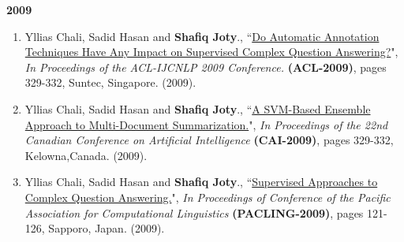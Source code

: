 \documentclass[paper=letter,fontsize=11pt]{scrartcl} %
\newcommand{\PaperEntry}[7]{
		\noindent #1, ``\href{#7}{#2}", \textit{#3} \textbf{#4}, #5 (#6).}
\begin{document}
\Large \textbf{2009} \normalsize
\begin{enumerate}

\item \PaperEntry{Yllias Chali, Sadid Hasan and \textbf{Shafiq Joty}.}{Do Automatic Annotation Techniques Have Any Impact on Supervised Complex Question Answering?}{In Proceedings of the ACL-IJCNLP 2009 Conference.} {(ACL-2009)}{pages 329-332, Suntec, Singapore.}{2009}
{http://www.aclweb.org/anthology/P09-2083}

\item \PaperEntry{Yllias Chali, Sadid Hasan and \textbf{Shafiq Joty}.}{A SVM-Based Ensemble Approach to Multi-Document Summarization.}{In Proceedings of the 22nd Canadian Conference on Artificial Intelligence } {(CAI-2009)}{pages 329-332, Kelowna,Canada.}{2009}
{http://link.springer.com/chapter/10.1007\%2F978-3-642-01818-3_23}

\item \PaperEntry{Yllias Chali, Sadid Hasan and \textbf{Shafiq Joty}.}{Supervised Approaches to Complex Question Answering.}{In Proceedings of Conference of the Pacific Association for Computational Linguistics} {(PACLING-2009)}{pages 121-126, Sapporo, Japan.}{2009}
{http://www.sadidhasan.com/sadid-PACLING.pdf}

\end{enumerate}
\end{document}

